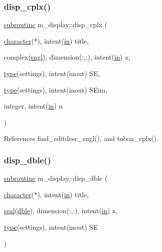 \subsubsection{\texorpdfstring{disp\+\_\+cplx()}{disp\_cplx()}}
{\footnotesize\ttfamily \hyperlink{M__stopwatch_83_8txt_acfbcff50169d691ff02d4a123ed70482}{subroutine} m\+\_\+display\+::disp\+\_\+cplx (\begin{DoxyParamCaption}\item[{\hyperlink{option__stopwatch_83_8txt_abd4b21fbbd175834027b5224bfe97e66}{character}($\ast$), intent(\hyperlink{M__journal_83_8txt_afce72651d1eed785a2132bee863b2f38}{in})}]{title,  }\item[{complex(\hyperlink{namespacem__display_a2ac86bc535c3ccc5947dbb3109c666b5}{sngl}), dimension(\+:,\+:), intent(\hyperlink{M__journal_83_8txt_afce72651d1eed785a2132bee863b2f38}{in})}]{x,  }\item[{\hyperlink{stop__watch_83_8txt_a70f0ead91c32e25323c03265aa302c1c}{type}(settings), intent(inout)}]{SE,  }\item[{\hyperlink{stop__watch_83_8txt_a70f0ead91c32e25323c03265aa302c1c}{type}(settings), intent(inout)}]{S\+Eim,  }\item[{integer, intent(\hyperlink{M__journal_83_8txt_afce72651d1eed785a2132bee863b2f38}{in})}]{n }\end{DoxyParamCaption})\hspace{0.3cm}{\ttfamily [private]}}



References find\+\_\+editdesc\+\_\+sngl(), and tobox\+\_\+cplx().

\mbox{\label{namespacem__display_a2d67bfdaf90a1173d8283050594c8efa}} 
\subsubsection{\texorpdfstring{disp\+\_\+dble()}{disp\_dble()}}
{\footnotesize\ttfamily \hyperlink{M__stopwatch_83_8txt_acfbcff50169d691ff02d4a123ed70482}{subroutine} m\+\_\+display\+::disp\+\_\+dble (\begin{DoxyParamCaption}\item[{\hyperlink{option__stopwatch_83_8txt_abd4b21fbbd175834027b5224bfe97e66}{character}($\ast$), intent(\hyperlink{M__journal_83_8txt_afce72651d1eed785a2132bee863b2f38}{in})}]{title,  }\item[{\hyperlink{read__watch_83_8txt_abdb62bde002f38ef75f810d3a905a823}{real}(\hyperlink{namespacem__display_a46d90b75b6ccef7ccade133e5847e815}{dble}), dimension(\+:,\+:), intent(\hyperlink{M__journal_83_8txt_afce72651d1eed785a2132bee863b2f38}{in})}]{x,  }\item[{\hyperlink{stop__watch_83_8txt_a70f0ead91c32e25323c03265aa302c1c}{type}(settings), intent(inout)}]{SE }\end{DoxyParamCaption})\hspace{0.3cm}{\ttfamily [private]}}



